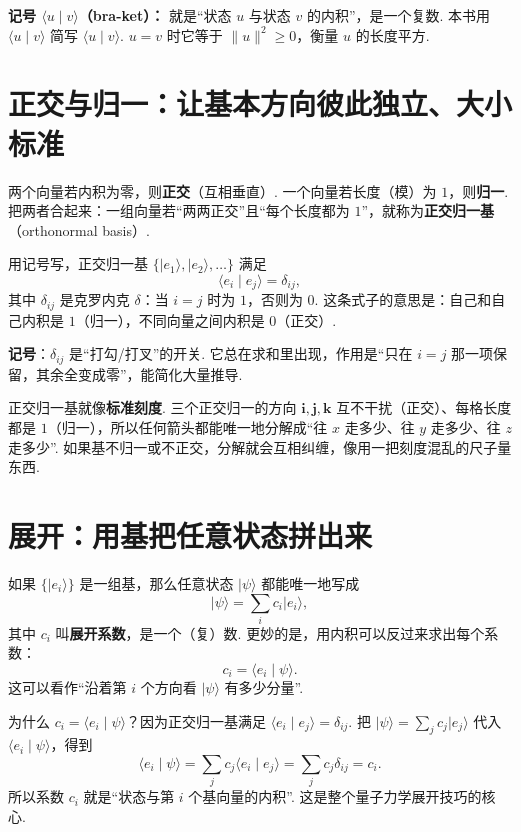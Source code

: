\documentclass[UTF8,11pt,a4paper,openany]{ctexbook}
\newcommand{\ket}[1]{\lvert #1\rangle}\newcommand{\bra}[1]{\langle #1\rvert}
\newcommand{\braket}[2]{\langle #1\mid #2\rangle}\newcommand{\ii}{\mathrm i}
\newcommand{\term}[1]{\textbf{#1}}
\begin{document}
\begin{notationbox}
\textbf{记号 $\braket u v$（bra-ket）：} 就是“状态 $u$ 与状态 $v$ 的内积”，是一个复数. 本书用 $\braket u v$ 简写 $\langle u\mid v\rangle$. $u=v$ 时它等于 $\|u\|^2\ge0$，衡量 $u$ 的长度平方. 
\end{notationbox}

\section{正交与归一：让基本方向彼此独立、大小标准}
\label{sec:orthonormal}
两个向量若内积为零，则\term{正交}（互相垂直）. 一个向量若长度（模）为 $1$，则\term{归一}. 把两者合起来：一组向量若“两两正交”且“每个长度都为 $1$”，就称为\term{正交归一基}（orthonormal basis）. 

用记号写，正交归一基 $\{\ket{e_1},\ket{e_2},\ldots\}$ 满足
\[
\braket{e_i}{e_j}=\delta_{ij},
\]
其中 $\delta_{ij}$ 是克罗内克 $\delta$：当 $i=j$ 时为 $1$，否则为 $0$. 这条式子的意思是：自己和自己内积是 $1$（归一），不同向量之间内积是 $0$（正交）. 

\textbf{记号}：$\delta_{ij}$ 是“打勾/打叉”的开关. 它总在求和里出现，作用是“只在 $i=j$ 那一项保留，其余全变成零”，能简化大量推导. 

\begin{analogybox}
正交归一基就像\textbf{标准刻度}. 三个正交归一的方向 $\mathbf i,\mathbf j,\mathbf k$ 互不干扰（正交）、每格长度都是 $1$（归一），所以任何箭头都能唯一地分解成“往 $x$ 走多少、往 $y$ 走多少、往 $z$ 走多少”. 如果基不归一或不正交，分解就会互相纠缠，像用一把刻度混乱的尺子量东西. 
\end{analogybox}

\section{展开：用基把任意状态拼出来}
如果 $\{\ket{e_i}\}$ 是一组基，那么任意状态 $\ket\psi$ 都能唯一地写成
\[
\ket\psi=\sum_i c_i\ket{e_i},
\]
其中 $c_i$ 叫\term{展开系数}，是一个（复）数. 更妙的是，用内积可以反过来求出每个系数：
\[
c_i=\braket{e_i}{\psi}.
\]
这可以看作“沿着第 $i$ 个方向看 $\ket\psi$ 有多少分量”. 

\begin{derivationbox}为什么 $c_i=\braket{e_i}{\psi}$？因为正交归一基满足 $\braket{e_i}{e_j}=\delta_{ij}$. 把 $\ket\psi=\sum_j c_j\ket{e_j}$ 代入 $\braket{e_i}{\psi}$，得到
\[
\braket{e_i}{\psi}=\sum_j c_j\braket{e_i}{e_j}=\sum_j c_j\delta_{ij}=c_i.
\]
所以系数 $c_i$ 就是“状态与第 $i$ 个基向量的内积”. 这是整个量子力学展开技巧的核心. \end{derivationbox}
\end{document}
